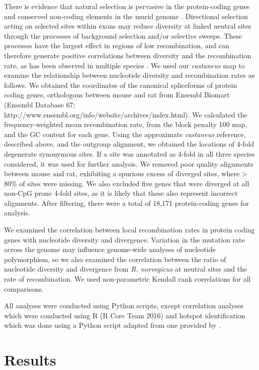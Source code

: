 There is evidence that natural selection is pervasive in the protein-coding genes and conserved non-coding elements in the murid genome \citep{RN158, RN170, RN122}. Directional selection acting on selected sites within exons may reduce diversity at linked neutral sites through the processes of background selection and/or selective sweeps. These processes have the largest effect in regions of low recombination, and can therefore generate positive correlations between diversity and the recombination rate, as has been observed in multiple species \citep{RN117}. We used our \textit{castaneus} map to examine the relationship between nucleotide diversity and recombination rates as follows. We obtained the coordinates of the canonical spliceforms of protein coding genes, orthologous between mouse and rat from Ensembl Biomart (Ensembl Database 67; http://www.ensembl.org/info/website/archives/index.html). We calculated the frequency-weighted mean recombination rate, from the block penalty 100 map, and the GC content for each gene. Using the approximate \textit{castaneus} reference, described above, and the outgroup alignment, we obtained the locations of 4-fold degenerate synonymous sites. If a site was annotated as 4-fold in all three species considered, it was used for further analysis. We removed poor quality alignments between mouse and rat, exhibiting a spurious excess of diverged sites, where > 80\% of sites were missing. We also excluded five genes that were diverged at all non-CpG prone 4-fold sites, as it is likely that these also represent incorrect alignments. After filtering, there were a total of 18,171 protein-coding genes for analysis.

We examined the correlation between local recombination rates in protein coding genes with nucleotide diversity and divergence. Variation in the mutation rate across the genome may influence genome-wide analyses of nucleotide polymorphism, so we also examined the correlation between the ratio of nucleotide diversity and divergence from \textit{R. norvegicus} at neutral sites and the rate of recombination. We used non-parametric Kendall rank correlations for all comparisons.

All analyses were conducted using Python scripts, except correlation analyses which were conducted using R (R Core Team 2016) and hotspot identification which was done using a Python script adapted from one provided by \cite{RN258}. 

\section{Results}
 

